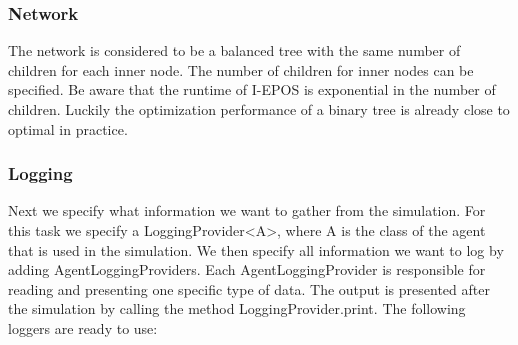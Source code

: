 \documentclass[11pt]{article} %
\newcommand{\code}{}
\begin{document}
\subsubsection*{Network}
The network is considered to be a balanced tree with the same number of children for each inner node. The number of children for inner nodes can be specified. Be aware that the runtime of I-EPOS is exponential in the number of children. Luckily the optimization performance of a binary tree is already close to optimal in practice.

\subsubsection*{Logging}
Next we specify what information we want to gather from the simulation. For this task we specify a \code{LoggingProvider<A>}, where \code{A} is the class of the agent that is used in the simulation.
We then specify all information we want to log by adding \code{AgentLoggingProvider}s. Each \code{AgentLoggingProvider} is responsible for reading and presenting one specific type of data. The output is presented after the simulation by calling the method \code{LoggingProvider.print}. The following loggers are ready to use:
\end{document}
